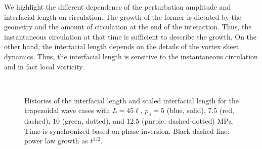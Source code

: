 \documentclass{jfm}%
\begin{document}
We highlight the different dependence of the perturbation amplitude
and interfacial length on circulation. The growth of the former is
dictated by the geometry and the amount of circulation at the end of
the interaction. Thus, the instantaneous circulation at that time is
sufficient to describe the growth. On the other hand, the interfacial
length depends on the details of the vortex sheet dynamics. Thus, the
interfacial length is sensitive to the instantaneous circulation and
in fact local vorticity.
%
\begin{figure}
  \centering
  \begin{subfigure}{0.45\textwidth}
     \label{fig:trapz_scp_t1000_unscaled}
   \end{subfigure}
   ~~~
   \begin{subfigure}{0.45\textwidth}
     \label{fig:trapz_scp_t1000_scaled} 
  \end{subfigure}
  \caption{Histories of the
    interfacial length  and
    scaled interfacial length  for
    the trapezoidal wave cases with $L=45\ell$, $p_a = 5$ (blue, solid), $7.5$
    (red, dashed), $10$ (green, dotted), and $12.5$ (purple, dashed-dotted) MPa. Time is synchronized
    based on phase inversion. Black dashed line: power law growth as
    $t^{1/2}$.}
  \label{fig:trapz_scp_t1000}
\end{figure}
% 
\end{document}
